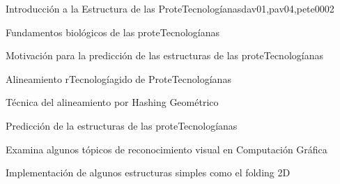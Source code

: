 \begin{syllabus}
\begin{unit}{Introducción a la Estructura de las ProteTecnologíanas}{dav01,pav04,pete00}{0}{2}
\begin{topics}
        \item Fundamentos biológicos de las proteTecnologíanas
        \item Motivación para la predicción de las estructuras de las proteTecnologíanas
        \item Alineamiento rTecnologíagido de ProteTecnologíanas
        \item Técnica del alineamiento por Hashing Geométrico
        \item Predicción de la estructuras de las proteTecnologíanas
    \end{topics}

    \begin{unitgoals}
        \item Examina algunos tópicos de reconocimiento visual en Computación Gráfica
        \item Implementación de algunos estructuras simples como el folding 2D
    \end{unitgoals}
\end{unit}



\begin{coursebibliography}
\end{coursebibliography}

\end{syllabus}
